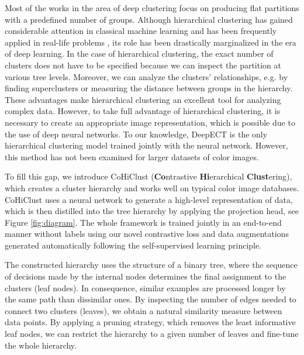 \documentclass[runningheads]{llncs}
\def\our{CoHiClust}
\begin{document}
Most of the works in the area of deep clustering focus on producing flat partitions with a predefined number of groups. Although hierarchical clustering has gained considerable attention in classical machine learning and has been frequently applied in real-life problems \cite{zou2020sequence,smieja2014asymmetric}, its role has been drastically marginalized in the era of deep learning. In the case of hierarchical clustering, the exact number of clusters does not have to be specified because we can inspect the partition at various tree levels. Moreover, we can analyze the clusters' relationships, e.g. by finding superclusters or measuring the distance between groups in the hierarchy. These advantages make hierarchical clustering an excellent tool for analyzing complex data. However, to take full advantage of hierarchical clustering, it is necessary to create an appropriate image representation, which is possible due to the use of deep neural networks. To our knowledge, DeepECT \cite{mautz2019deep,mautz2020deepect} is the only hierarchical clustering model trained jointly with the neural network. However, this method has not been examined for larger datasets of color images.

To fill this gap, we introduce \our{} ({\bf Co}ntrastive {\bf Hi}erarchical {\bf Clust}ering), which creates a cluster hierarchy and works well on typical color image databases. \our{} uses a neural network to generate a high-level representation of data, which is then distilled into the tree hierarchy by applying the projection head, see Figure \ref{fig:diagram}. The whole framework is trained jointly in an end-to-end manner without labels using our novel contrastive loss and data augmentations generated automatically following the self-supervised learning principle.

The constructed hierarchy uses the structure of a binary tree, where the sequence of decisions made by the internal nodes determines the final assignment to the clusters (leaf nodes). In consequence, similar examples are processed longer by the same path than dissimilar ones. By inspecting the number of edges needed to connect two clusters (leaves), we obtain a natural similarity measure between data points. By applying a pruning strategy, which removes the least informative leaf nodes, we can restrict the hierarchy to a given number of leaves and fine-tune the whole hierarchy.
\end{document}
